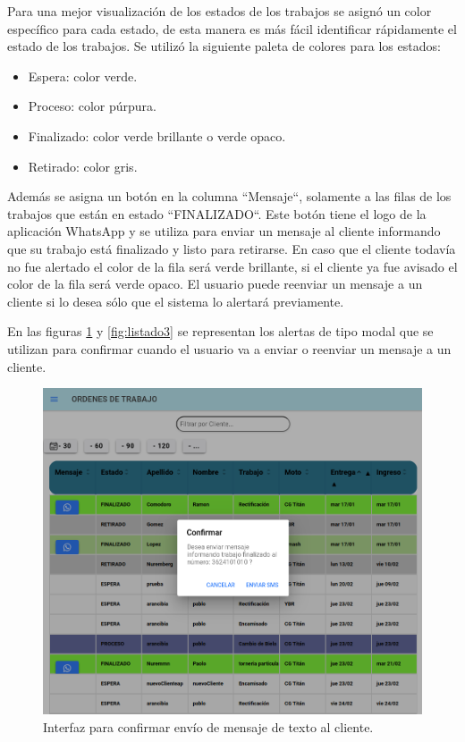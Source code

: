 Para una mejor visualización de los estados de los trabajos se asignó un color específico para cada estado, de esta manera es más fácil identificar rápidamente el estado de los trabajos. Se utilizó la siguiente paleta de colores para los estados:

\begin{itemize}
\item Espera: color verde.
\item Proceso: color púrpura.
\item Finalizado: color verde brillante o verde opaco.
\item Retirado: color gris. 
\end{itemize} 

Además se asigna un botón en la columna ``Mensaje``, solamente a las filas de los trabajos que están en estado ``FINALIZADO``. Este botón tiene el logo de la aplicación WhatsApp y se utiliza para enviar un mensaje al cliente informando que su trabajo está finalizado y listo para retirarse. En caso que el cliente todavía no fue alertado el color de la fila será verde brillante, si el cliente ya fue avisado el color de la fila será verde opaco. El usuario puede reenviar un mensaje a un cliente si lo desea sólo que el sistema lo alertará previamente.

En las figuras \ref{fig:listado2} y \ref{fig:listado3} se representan los alertas de tipo modal que se utilizan para confirmar cuando el usuario va a enviar o reenviar un mensaje a un cliente.

\begin{figure}[H]
	\centering
	\includegraphics[scale=.35]{./Figures/listado-2.png}
	\caption{Interfaz para confirmar envío de mensaje de texto al cliente.}
	\label{fig:listado2}
\end{figure}

